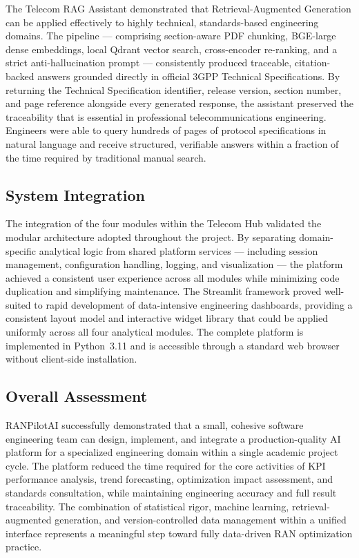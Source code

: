 The Telecom RAG Assistant demonstrated that Retrieval-Augmented Generation can be applied effectively to highly technical, standards-based engineering domains. The pipeline — comprising section-aware PDF chunking, BGE-large dense embeddings, local Qdrant vector search, cross-encoder re-ranking, and a strict anti-hallucination prompt — consistently produced traceable, citation-backed answers grounded directly in official 3GPP Technical Specifications. By returning the Technical Specification identifier, release version, section number, and page reference alongside every generated response, the assistant preserved the traceability that is essential in professional telecommunications engineering. Engineers were able to query hundreds of pages of protocol specifications in natural language and receive structured, verifiable answers within a fraction of the time required by traditional manual search.

\subsection*{System Integration}

The integration of the four modules within the Telecom Hub validated the modular architecture adopted throughout the project. By separating domain-specific analytical logic from shared platform services — including session management, configuration handling, logging, and visualization — the platform achieved a consistent user experience across all modules while minimizing code duplication and simplifying maintenance. The Streamlit framework proved well-suited to rapid development of data-intensive engineering dashboards, providing a consistent layout model and interactive widget library that could be applied uniformly across all four analytical modules. The complete platform is implemented in Python~3.11 and is accessible through a standard web browser without client-side installation.

\subsection*{Overall Assessment}

RANPilotAI successfully demonstrated that a small, cohesive software engineering team can design, implement, and integrate a production-quality AI platform for a specialized engineering domain within a single academic project cycle. The platform reduced the time required for the core activities of KPI performance analysis, trend forecasting, optimization impact assessment, and standards consultation, while maintaining engineering accuracy and full result traceability. The combination of statistical rigor, machine learning, retrieval-augmented generation, and version-controlled data management within a unified interface represents a meaningful step toward fully data-driven RAN optimization practice.

